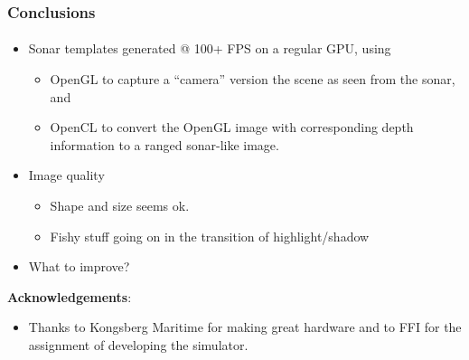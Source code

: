 \documentclass[
    beamer                                       %
  ,table,dvipsnames,svgnames
]{common/mytemplate}
\begin{document}
{
%
\begin{frame}
\vspace{-25pt}\frametitle{\color{white}Conclusions}
\framesubtitle{}
\vspace{-5pt}\color{white}
\begin{itemize}
\item \color{white}Sonar templates generated @ 100+ FPS on a regular GPU, using
\begin{itemize}
\item \color{white}OpenGL to capture a ``camera'' version the scene as seen from the sonar, and
\item \color{white}OpenCL to convert the OpenGL image with corresponding depth information to a ranged sonar-like image.
\end{itemize}
\item \color{white}Image quality
\begin{itemize}
\item \color{white}Shape and size seems ok.
\item \color{white}Fishy stuff going on in the transition of highlight/shadow
\end{itemize}
\item \color{white}What to improve?
\end{itemize}
\vfill
\textbf{\color{black}Acknowledgements}:
\begin{itemize}
\item Thanks to Kongsberg Maritime for making great hardware and to FFI for the assignment of developing the simulator.
\end{itemize}
\end{frame}
}
\end{document}
